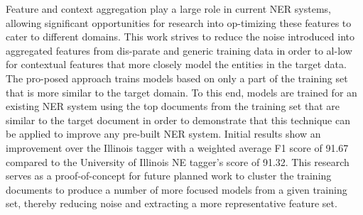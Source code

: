 Feature and context aggregation play a large role in current NER systems, allowing significant opportunities for research into op-timizing these features
 to cater to different domains. This work strives to reduce the noise introduced
 into aggregated features from dis-parate and generic training data in order to
 al-low for contextual features that more closely model the entities in the
 target data. The pro-posed approach trains models based on only a part of the
 training set that is more similar to the target domain. To this end, models are
 trained for an existing NER system using the top documents from the training
 set that are similar to the target document in order to demonstrate that this
 technique can be applied to improve any pre-built NER system. Initial results
 show an improvement over the Illinois tagger with a weighted average F1 score
 of 91.67 compared to the University of Illinois NE tagger's score of 91.32.
 This research serves as a proof-of-concept for future planned work to cluster
 the training documents to produce a number of more focused models from a given
 training set, thereby reducing noise and extracting a more representative
 feature set.

